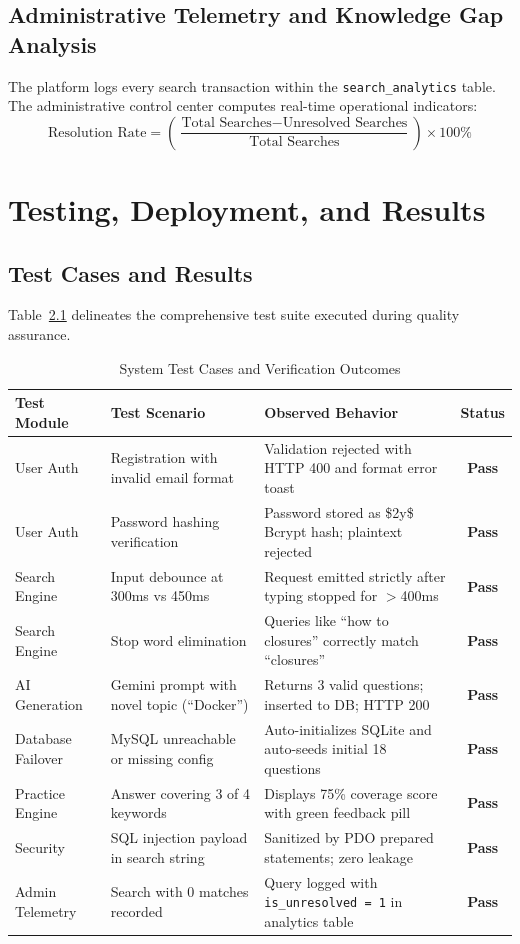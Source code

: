 \documentclass[12pt,a4paper]{report}
\begin{document}
\section{Administrative Telemetry and Knowledge Gap Analysis}
The platform logs every search transaction within the \texttt{search\_analytics} table. The administrative control center computes real-time operational indicators:
\begin{equation}
\text{Resolution Rate} = \left( \frac{\text{Total Searches} - \text{Unresolved Searches}}{\text{Total Searches}} \right) \times 100\%
\end{equation}

\chapter{Testing, Deployment, and Results}
\label{chap:test_deploy}

\section{Test Cases and Results}
Table~\ref{tab:test_cases} delineates the comprehensive test suite executed during quality assurance.

\begin{table}[h!]
\centering
\caption{System Test Cases and Verification Outcomes}
\label{tab:test_cases}
\begin{tabularx}{\textwidth}{p{2.5cm}p{4cm}p{4.5cm}c}
\toprule
\textbf{Test Module} & \textbf{Test Scenario} & \textbf{Observed Behavior} & \textbf{Status} \\
\midrule
User Auth & Registration with invalid email format & Validation rejected with HTTP 400 and format error toast & \textbf{Pass} \\
User Auth & Password hashing verification & Password stored as \$2y\$ Bcrypt hash; plaintext rejected & \textbf{Pass} \\
Search Engine & Input debounce at 300ms vs 450ms & Request emitted strictly after typing stopped for $>$400ms & \textbf{Pass} \\
Search Engine & Stop word elimination & Queries like ``how to closures'' correctly match ``closures'' & \textbf{Pass} \\
AI Generation & Gemini prompt with novel topic (``Docker'') & Returns 3 valid questions; inserted to DB; HTTP 200 & \textbf{Pass} \\
Database Failover & MySQL unreachable or missing config & Auto-initializes SQLite and auto-seeds initial 18 questions & \textbf{Pass} \\
Practice Engine & Answer covering 3 of 4 keywords & Displays 75\% coverage score with green feedback pill & \textbf{Pass} \\
Security & SQL injection payload in search string & Sanitized by PDO prepared statements; zero leakage & \textbf{Pass} \\
Admin Telemetry & Search with 0 matches recorded & Query logged with \texttt{is\_unresolved = 1} in analytics table & \textbf{Pass} \\
\bottomrule
\end{tabularx}
\end{table}
\end{document}
